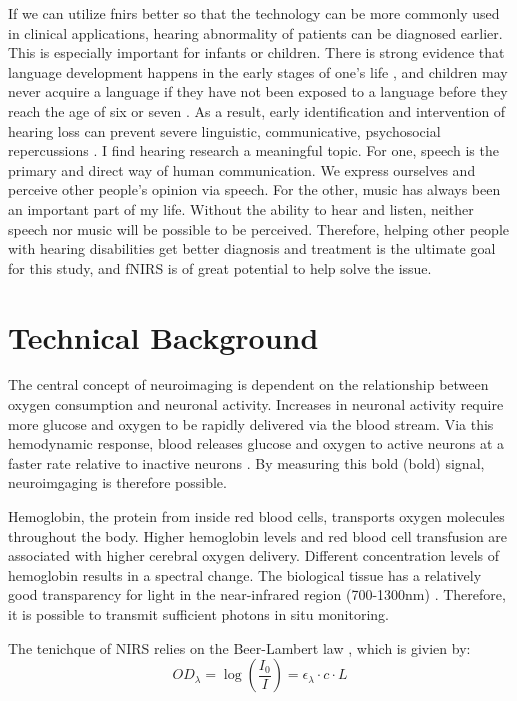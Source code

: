 If we can utilize \acrshort{fnirs} better so that the technology can be more commonly used in clinical applications, hearing abnormality of patients can be diagnosed earlier. This is especially important for infants or children. There is strong evidence that language development happens in the early stages of one's life \cite {Elissa1990}, and children may never acquire a language if they have not been exposed to a language before they reach the age of six or seven \cite {clark2000first}. As a result, early identification and intervention of hearing loss can prevent severe linguistic, communicative, psychosocial repercussions \cite {Robinshaw1995} \cite {Yoshinaga1998}. I find hearing research a meaningful topic. For one, speech is the primary and direct way of human communication. We express ourselves and perceive other people's opinion via speech. For the other, music has always been an important part of my life. Without the ability to hear and listen, neither speech nor music will be possible to be perceived. Therefore, helping other people with hearing disabilities get better diagnosis and treatment is the ultimate goal for this study, and fNIRS is of great potential to help solve the issue.

\section{Technical Background}
The central concept of neuroimaging is dependent on the relationship between oxygen consumption and neuronal activity. Increases in neuronal activity require more glucose and oxygen to be rapidly delivered via the blood stream. Via this hemodynamic response, blood releases glucose and oxygen to active neurons at a faster rate relative to inactive neurons \cite {Pelphrey2013}. By measuring this \acrlong{bold} (\acrshort{bold}) signal, neuroimgaging is therefore possible.

Hemoglobin, the protein from inside red blood cells, transports oxygen molecules throughout the body. Higher hemoglobin levels and red blood cell transfusion are associated with higher cerebral oxygen delivery. Different concentration levels of hemoglobin results in a spectral change. The biological tissue has a relatively good transparency for light in the near-infrared region (700-1300nm) \cite{doi:10.1126/science.929199}. Therefore, it is possible to transmit sufficient photons in situ monitoring. 

\newpage
The tenichque of NIRS relies on the Beer-Lambert law \cite{ BeerLambert}, which is givien by:
\begin{equation} 
OD_{\lambda} = \log \left(\frac {I_0}{I}\right) = \epsilon _{\lambda} \cdot c \cdot L
\end{equation}

